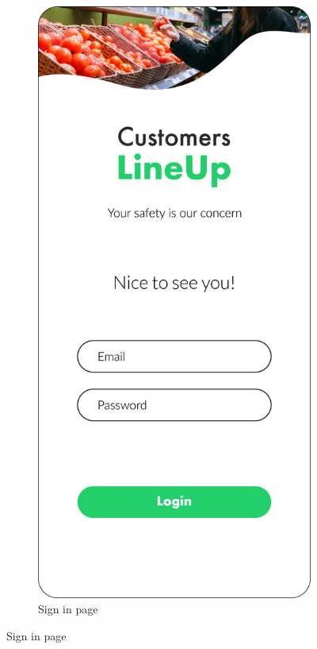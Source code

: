 \begin{figure}[H]
\begin{subfigure}[t]{0.28\textwidth}
    \end{subfigure}
    \quad
    \begin{subfigure}[t]{0.28\textwidth} 
        \includegraphics{../mockups/sign_in}
        \caption*{Sign in page}

\end{subfigure}
\end{figure}
